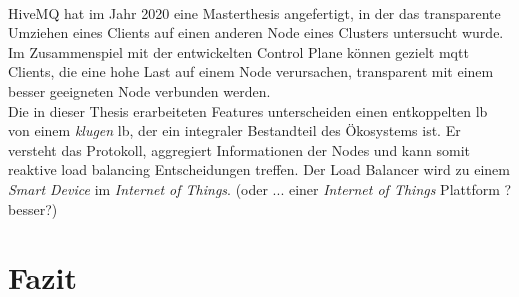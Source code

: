 \\
HiveMQ hat im Jahr 2020 eine Masterthesis angefertigt, in der das transparente Umziehen eines Clients auf einen anderen Node eines Clusters untersucht wurde. Im Zusammenspiel mit der entwickelten Control Plane können gezielt \ac{mqtt} Clients, die eine hohe Last auf einem Node verursachen, transparent mit einem besser geeigneten Node verbunden werden.
\\
Die in dieser Thesis erarbeiteten Features unterscheiden einen entkoppelten \acl{lb} von einem \textit{klugen} \acl{lb}, der ein integraler Bestandteil des Ökosystems ist. Er versteht das Protokoll, aggregiert Informationen der Nodes und kann somit reaktive load balancing Entscheidungen treffen. Der Load Balancer wird zu einem \textit{Smart Device} im \textit{Internet of Things}. (oder ... einer \textit{Internet of Things} Plattform ? besser?)

\section{Fazit}

\begin{comment}
Aus diesen Untersuchungen sind beispielsweise die Testszenarien aus Kapitel \ref{ss:test} entstanden, die zeigen sollen, dass bestimmte Verhaltensmuster der Clients eine ungleiche Lastverteilung im Cluster erzeugen können. Bei der Implementierung dieser Szenarien ist aufgefallen, wie komplex und unterschiedlich die Verhaltensmuster sein können.
Unterschiedliche Client Verhaltensmuster führen jedoch nicht grundsätzlich direkt zu einem Problem bei der Lastverteilung. Es ist die Kombination von unterschiedlichen Clients mit der Eigenschaft, dass \ac{mqtt} ein zustandsbehaftetes und verbindungsorientiertes Protokoll ist.
Der \acl{lb} kann nicht, wie zum Beispiel bei \ac{http}, einzelne Anfragen eines Clients an verschiedene Nodes schicken. Sobald ein Client verbunden ist, muss der Zielnode alle Anfragen des Clients bearbeiten, bis dieser die Verbindung beendet.
In der Realität will man dieses Verhalten bei \ac{http} oftmals gezielt erzwingen, um beispielsweise schnellere Antwortzeiten durch Cache-Speicher zu erzielen. Bei \ac{http} kann der \acl{lb} jedoch Pakete transparent zum Client an einen anderen Node schicken, wenn zum Beispiel der bisherige Zielnode überlastet ist. Bei \ac{mqtt} hat der \acl{lb} gar keine Möglichkeit die Last eines Clients nach dem Verbindungsaufbau zu steuern.
Dies untermauert die Relevanz der load balancing Entscheidung bei \ac{mqtt}.
\end{comment}

\begin{comment}

ausblick:
- extension die clients abschie{\ss}en kann
  - member einer shared subscription können immer abeschossen werden
- session roaming
- stateless

vielleicht:
- konzeptuell multiplexing

- man kann auch probleme bei clients lösen -> aber nicht alles
- load balancer unterstützt die steuerbarkeit

\end{comment}
